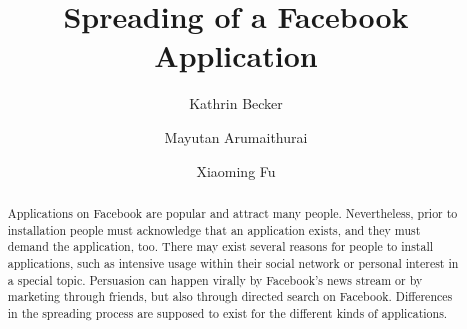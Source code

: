\documentclass[preprint,12pt]{elsarticle}
\begin{document}
\begin{frontmatter}



\title{Spreading of a Facebook Application}



\author[focal]{Kathrin Becker} 
\author[focal]{Mayutan Arumaithurai} %
\author[focal]{Xiaoming Fu} %

\address[focal]{Institute of Computer Science, Computer Networks (NET)
  Research Group, University of G\"ottingen}








\begin{abstract}
Applications on Facebook are popular and attract many
people. Nevertheless, prior to installation people must acknowledge that an application
exists, and they must demand the application, too.
There may exist several reasons for people to install
applications, such as intensive usage within their social network or
personal interest in a special topic. Persuasion can
happen virally by Facebook's news stream or by marketing through
friends, but also through directed search on 
Facebook. Differences in the spreading process are supposed to exist
for the different kinds of applications. 


\end{abstract}
\end{frontmatter}
\end{document}
